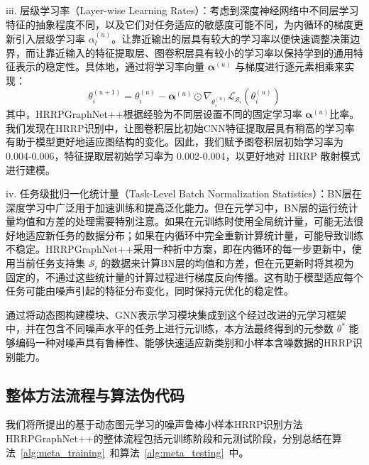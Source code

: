 iii.  层级学习率（Layer-wise Learning Rates）：考虑到深度神经网络中不同层学习特征的抽象程度不同，以及它们对任务适应的敏感度可能不同，为内循环的梯度更新引入层级学习率 $\alpha^{(u)}_l$。让靠近输出的层具有较大的学习率以便快速调整决策边界，而让靠近输入的特征提取层、图卷积层具有较小的学习率以保持学到的通用特征表示的稳定性。具体地，通过将学习率向量 $\boldsymbol{\alpha}^{(u)}$ 与梯度进行逐元素相乘来实现：
    \begin{equation}
        \theta_i^{(u+1)} = \theta_i^{(u)} - \boldsymbol{\alpha}^{(u)} \odot \nabla_{\theta_i^{(u)}} \mathcal{L}_{\mathcal{S}_i}(\theta_i^{(u)})
        \label{eq:layerwise_lr_update}
    \end{equation}
其中，HRRPGraphNet++根据经验为不同层设置不同的固定学习率 $\boldsymbol{\alpha}^{(u)}$比率。我们发现在HRRP识别中，让图卷积层比初始CNN特征提取层具有稍高的学习率有助于模型更好地适应图结构的变化。因此，我们赋予图卷积层初始学习率为0.004-0.006，特征提取层初始学习率为 0.002-0.004，以更好地对 HRRP 散射模式进行建模。

iv.  任务级批归一化统计量（Task-Level Batch Normalization Statistics）：BN层在深度学习中广泛用于加速训练和提高泛化能力。但在元学习中，BN层的运行统计量均值和方差的处理需要特别注意。如果在元训练时使用全局统计量，可能无法很好地适应新任务的数据分布；如果在内循环中完全重新计算统计量，可能导致训练不稳定。HRRPGraphNet++采用一种折中方案，即在内循环的每一步更新中，使用当前任务支持集 $\mathcal{S}_i$ 的数据来计算BN层的均值和方差，但在元更新时将其视为固定的，不通过这些统计量的计算过程进行梯度反向传播。这有助于模型适应每个任务可能由噪声引起的特征分布变化，同时保持元优化的稳定性。

通过将动态图构建模块、GNN表示学习模块集成到这个经过改进的元学习框架中，并在包含不同噪声水平的任务上进行元训练，本方法最终得到的元参数 $\theta^*$ 能够编码一种对噪声具有鲁棒性、能够快速适应新类别和小样本含噪数据的HRRP识别能力。

\subsection{整体方法流程与算法伪代码}
\label{subsec:algorithm}

我们将所提出的基于动态图元学习的噪声鲁棒小样本HRRP识别方法HRRPGraphNet++的整体流程包括元训练阶段和元测试阶段，分别总结在算法~\ref{alg:meta_training}~和算法~\ref{alg:meta_testing}~中。

